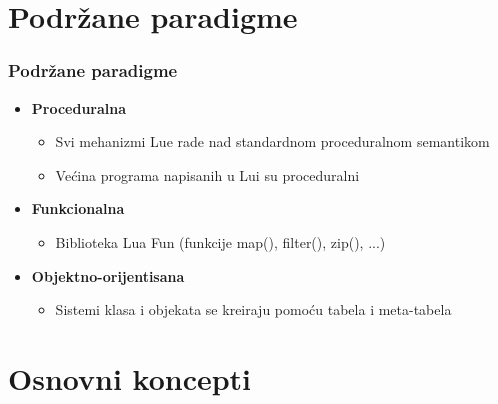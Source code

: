 \documentclass{beamer}
\begin{document}
\section{Podržane paradigme}
\begin{frame}
\frametitle{Podržane paradigme}

\begin{itemize}

\item \textbf{Proceduralna}
\begin{itemize}
\item Svi mehanizmi Lue rade nad standardnom proceduralnom semantikom
\item Većina programa napisanih u Lui su proceduralni
\end{itemize}

\item \textbf{Funkcionalna}
\begin{itemize}
\item Biblioteka Lua Fun (funkcije map(), filter(), zip(), ...)
\end{itemize}

\item \textbf{Objektno-orijentisana}
\begin{itemize}
\item Sistemi klasa i objekata se kreiraju pomoću tabela i meta-tabela
\end{itemize}


\end{itemize}

\end{frame}



\section{Osnovni koncepti}
\end{document}
